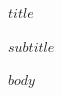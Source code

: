 \documentclass[11pt,a4paper]{article}
\begin{document}
\begin{center}
{\LARGE $title$\par}
\vspace{5pt}
{\large $subtitle$\par}
\end{center}
{\small\tableofcontents}
\vspace{7pt}
$body$
\end{document}
